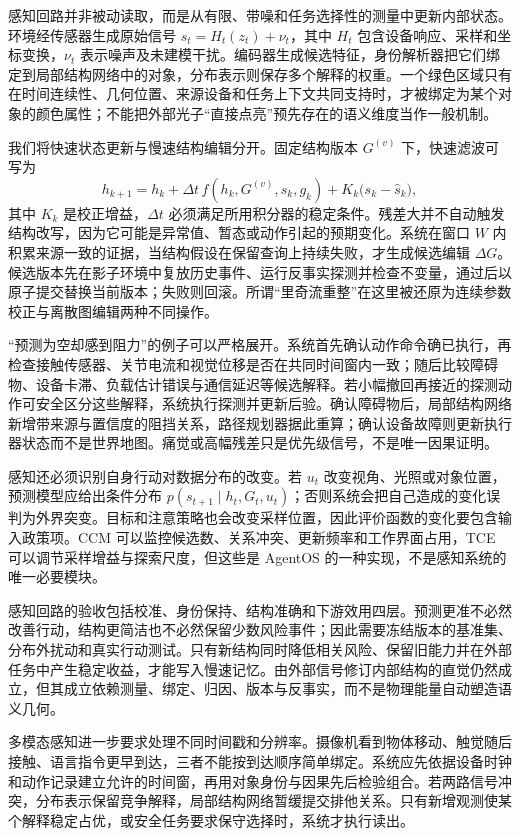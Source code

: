 感知回路并非被动读取，而是从有限、带噪和任务选择性的测量中更新内部状态。环境经传感器生成原始信号 $s_t=H_t(z_t)+\nu_t$，其中 $H_t$ 包含设备响应、采样和坐标变换，$\nu_t$ 表示噪声及未建模干扰。编码器生成候选特征，身份解析器把它们绑定到局部结构网络中的对象，分布表示则保存多个解释的权重。一个绿色区域只有在时间连续性、几何位置、来源设备和任务上下文共同支持时，才被绑定为某个对象的颜色属性；不能把外部光子“直接点亮”预先存在的语义维度当作一般机制。

我们将快速状态更新与慢速结构编辑分开。固定结构版本 $G^{(v)}$ 下，快速滤波可写为
\[
h_{k+1}=h_k+\Delta t\,f(h_k,G^{(v)},s_k,g_k)+K_k\bigl(s_k-\widehat s_k\bigr),
\]
其中 $K_k$ 是校正增益，$\Delta t$ 必须满足所用积分器的稳定条件。残差大并不自动触发结构改写，因为它可能是异常值、暂态或动作引起的预期变化。系统在窗口 $W$ 内积累来源一致的证据，当结构假设在保留查询上持续失败，才生成候选编辑 $\Delta G$。候选版本先在影子环境中复放历史事件、运行反事实探测并检查不变量，通过后以原子提交替换当前版本；失败则回滚。所谓“里奇流重整”在这里被还原为连续参数校正与离散图编辑两种不同操作。

“预测为空却感到阻力”的例子可以严格展开。系统首先确认动作命令确已执行，再检查接触传感器、关节电流和视觉位移是否在共同时间窗内一致；随后比较障碍物、设备卡滞、负载估计错误与通信延迟等候选解释。若小幅撤回再接近的探测动作可安全区分这些解释，系统执行探测并更新后验。确认障碍物后，局部结构网络新增带来源与置信度的阻挡关系，路径规划器据此重算；确认设备故障则更新执行器状态而不是世界地图。痛觉或高幅残差只是优先级信号，不是唯一因果证明。

感知还必须识别自身行动对数据分布的改变。若 $u_t$ 改变视角、光照或对象位置，预测模型应给出条件分布 $p(s_{t+1}\mid h_t,G_t,u_t)$；否则系统会把自己造成的变化误判为外界突变。目标和注意策略也会改变采样位置，因此评价函数的变化要包含输入政策项。CCM 可以监控候选数、关系冲突、更新频率和工作界面占用，TCE 可以调节采样增益与探索尺度，但这些是 AgentOS 的一种实现，不是感知系统的唯一必要模块。

感知回路的验收包括校准、身份保持、结构准确和下游效用四层。预测更准不必然改善行动，结构更简洁也不必然保留少数风险事件；因此需要冻结版本的基准集、分布外扰动和真实行动测试。只有新结构同时降低相关风险、保留旧能力并在外部任务中产生稳定收益，才能写入慢速记忆。由外部信号修订内部结构的直觉仍然成立，但其成立依赖测量、绑定、归因、版本与反事实，而不是物理能量自动塑造语义几何。

多模态感知进一步要求处理不同时间戳和分辨率。摄像机看到物体移动、触觉随后接触、语言指令更早到达，三者不能按到达顺序简单绑定。系统应先依据设备时钟和动作记录建立允许的时间窗，再用对象身份与因果先后检验组合。若两路信号冲突，分布表示保留竞争解释，局部结构网络暂缓提交排他关系。只有新增观测使某个解释稳定占优，或安全任务要求保守选择时，系统才执行读出。

